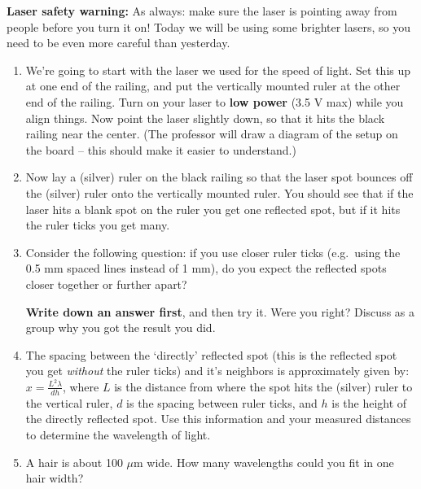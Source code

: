 \documentclass[12pt, letterpaper]{article}
\begin{document}
\textbf{Laser safety warning:} As always: make sure the laser is pointing away from people before you turn it on!  Today we will be using some brighter lasers, so you need to be even more careful than yesterday.

\begin{enumerate}
	\item We're going to start with the laser we used for the speed of light.
	Set this up at one end of the railing, and put the vertically mounted ruler at the other end of the railing.
	Turn on your laser to \textbf{low power} (3.5 V max) while you align things.
	Now point the laser slightly down, so that it hits the black railing near the center.
	(The professor will draw a diagram of the setup on the board -- this should make it easier to understand.)
	
	\item Now lay a (silver) ruler on the black railing so that the laser spot bounces off the (silver) ruler onto the vertically mounted ruler.  You should see that if the laser hits a blank spot on the ruler you get one reflected spot, but if it hits the ruler ticks you get many.
	
	\item Consider the following question: if you use closer ruler ticks (e.g.~using the 0.5 mm spaced lines instead of 1 mm), do you expect the reflected spots closer together or further apart?
	
	\textbf{Write down an answer first}, and then try it.  
	Were you right?
	Discuss as a group why you got the result you did.
	
	\answergrid{5cm}
	
	\item The spacing between the `directly' reflected spot (this is the reflected spot you get \emph{without} the ruler ticks) and it's neighbors is approximately given by: $x = \frac{L^2 \lambda}{d h}$, where $L$ is the distance from where the spot hits the (silver) ruler to the vertical ruler, $d$ is the spacing between ruler ticks, and $h$ is the height of the directly reflected spot.
	Use this information and your measured distances to determine the wavelength of light.

	\fillanswergrid
	
	\item A hair is about 100 $\mu$m wide.  How many wavelengths could you fit in one hair width?
		

\end{enumerate}
\end{document}
